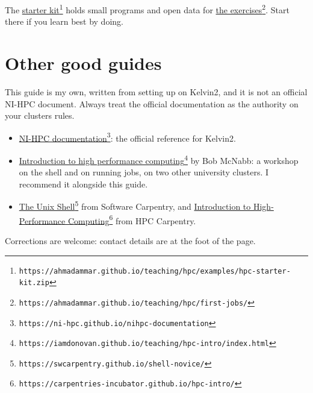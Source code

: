 The \href{https://ahmadammar.github.io/teaching/hpc/examples/hpc-starter-kit.zip}{starter kit}\footnote{\texttt{https://ahmadammar.github.io/teaching/hpc/examples/hpc-starter-kit.zip}} holds small programs and open data for \href{https://ahmadammar.github.io/teaching/hpc/first-jobs/}{the exercises}\footnote{\texttt{https://ahmadammar.github.io/teaching/hpc/first-jobs/}}. Start there if you learn best by doing.

\section{Other good guides}\label{other-good-guides}

This guide is my own, written from setting up on Kelvin2, and it is not an official NI-HPC document. Always treat the official documentation as the authority on your cluster\textquotesingle s rules.

\begin{itemize}
\tightlist
\item
  \href{https://ni-hpc.github.io/nihpc-documentation}{NI-HPC documentation}\footnote{\texttt{https://ni-hpc.github.io/nihpc-documentation}}: the official reference for Kelvin2.
\item
  \href{https://iamdonovan.github.io/teaching/hpc-intro/index.html}{Introduction to high performance computing}\footnote{\texttt{https://iamdonovan.github.io/teaching/hpc-intro/index.html}} by Bob McNabb: a workshop on the shell and on running jobs, on two other university clusters. I recommend it alongside this guide.
\item
  \href{https://swcarpentry.github.io/shell-novice/}{The Unix Shell}\footnote{\texttt{https://swcarpentry.github.io/shell-novice/}} from Software Carpentry, and \href{https://carpentries-incubator.github.io/hpc-intro/}{Introduction to High-Performance Computing}\footnote{\texttt{https://carpentries-incubator.github.io/hpc-intro/}} from HPC Carpentry.
\end{itemize}

Corrections are welcome: contact details are at the foot of the page.

